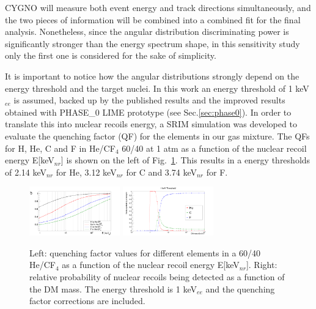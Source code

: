 \documentclass[physics,article,submit,moreauthors,pdftex]{Definitions/mdpi}
\begin{document}
CYGNO will measure both event energy and track directions simultaneously, and the two pieces of information will be combined into a combined fit for the final analysis. Nonetheless, since the angular distribution discriminating power is significantly stronger than the energy spectrum shape, in this sensitivity study only the first one is considered for the sake of simplicity. 

It is important to notice how the angular distributions strongly depend on the energy threshold and the target nuclei. In this work an energy threshold of 1 keV$_{ee}$ is assumed, backed up by the published results \cite{bib:fe55} and the improved results obtained with PHASE\_0 LIME prototype (see Sec.\ref{sec:phase0}). In order to translate this into nuclear recoils energy, a SRIM simulation was developed to evaluate the quenching factor (QF) for the elements in our gas mixture. The QFs for H, He, C and F in He/CF$_4$ 60/40 at 1 atm as a function of the nuclear recoil energy E[keV$_{nr}$] is shown on the left of Fig.~\ref{fig:QF_Probele}. This results in a energy thresholds of 2.14 keV$_{nr}$ for He, 3.12 keV$_{nr}$ for C and 3.74 keV$_{nr}$ for F.

\begin{figure}[!t]
\centering
 \includegraphics[width=0.35\textwidth]{QF.png}
 \includegraphics[width=0.35\textwidth]{Prob_hitting.png}
 \caption{Left: quenching factor values for different elements in a 60/40 He/CF$_4$ as a function of the nuclear recoil energy E[keV$_{nr}$]. Right: relative probability of nuclear recoils being detected as a function of the DM mass. The energy threshold is 1 keV$_{ee}$ and the quenching factor corrections are included.}
 \label{fig:QF_Probele}
 \end{figure}
\end{document}
